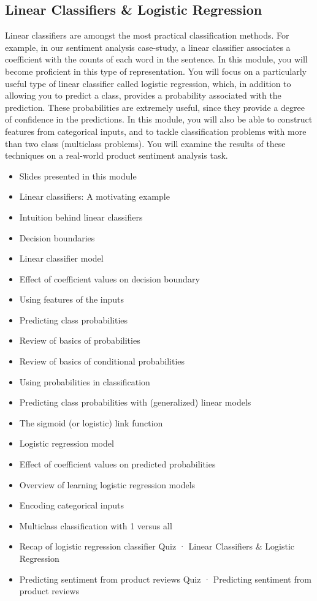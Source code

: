 \subsection{Linear Classifiers \& Logistic Regression}
Linear classifiers are amongst the most practical classification methods. For example, in our sentiment analysis case-study, a linear classifier associates a coefficient with the counts of each word in the sentence. In this module, you will become proficient in this type of representation. You will focus on a particularly useful type of linear classifier called logistic regression, which, in addition to allowing you to predict a class, provides a probability associated with the prediction. These probabilities are extremely useful, since they provide a degree of confidence in the predictions. In this module, you will also be able to construct features from categorical inputs, and to tackle classification problems with more than two class (multiclass problems). You will examine the results of these techniques on a real-world product sentiment analysis task.
\begin{itemize}
\item Slides presented in this module
\item Linear classifiers: A motivating example
\item Intuition behind linear classifiers
\item Decision boundaries
\item Linear classifier model
\item Effect of coefficient values on decision boundary
\item Using features of the inputs
\item Predicting class probabilities
\item Review of basics of probabilities
\item Review of basics of conditional probabilities
\item Using probabilities in classification
\item Predicting class probabilities with (generalized) linear models
\item The sigmoid (or logistic) link function
\item Logistic regression model
\item Effect of coefficient values on predicted probabilities
\item Overview of learning logistic regression models
\item Encoding categorical inputs
\item Multiclass classification with 1 versus all
\item Recap of logistic regression classifier
Quiz · Linear Classifiers \& Logistic Regression
\item Predicting sentiment from product reviews
Quiz · Predicting sentiment from product reviews
\end{itemize}
